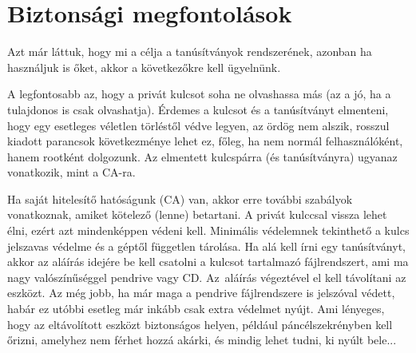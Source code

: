 \section{Biztonsági megfontolások}
Azt már láttuk, hogy mi a célja a tanúsítványok rendszerének, azonban ha használjuk is őket, akkor a következőkre kell
ügyelnünk.

A legfontosabb az, hogy a privát kulcsot soha ne olvashassa más (az a jó, ha a tulajdonos is csak olvashatja). Érdemes a
kulcsot és a tanúsítványt elmenteni, hogy egy esetleges véletlen törléstől védve legyen, az ördög nem alszik, rosszul
kiadott parancsok következménye lehet ez, főleg, ha nem normál felhasználóként, hanem rootként dolgozunk. Az elmentett
kulcspárra (és tanúsítványra) ugyanaz vonatkozik, mint a CA-ra.

Ha saját hitelesítő hatóságunk (CA) van, akkor erre további szabályok vonatkoznak, amiket kötelező (lenne) betartani. A
privát kulccsal vissza lehet élni, ezért azt mindenképpen védeni kell. Minimális védelemnek tekinthető a kulcs jelszavas
védelme és a géptől független tárolása. Ha alá kell írni egy tanúsítványt, akkor az aláírás idejére be kell csatolni a
kulcsot tartalmazó fájlrendszert, ami ma nagy valószínűséggel pendrive vagy CD. Az~aláírás végeztével el kell távolítani
az eszközt. Az még jobb, ha már maga a pendrive fájlrendszere is jelszóval védett, habár ez utóbbi esetleg már inkább
csak extra védelmet nyújt. Ami lényeges, hogy az eltávolított eszközt biztonságos helyen, például páncélszekrényben kell
őrizni, amelyhez nem férhet hozzá akárki, és mindig lehet tudni, ki nyúlt bele...


